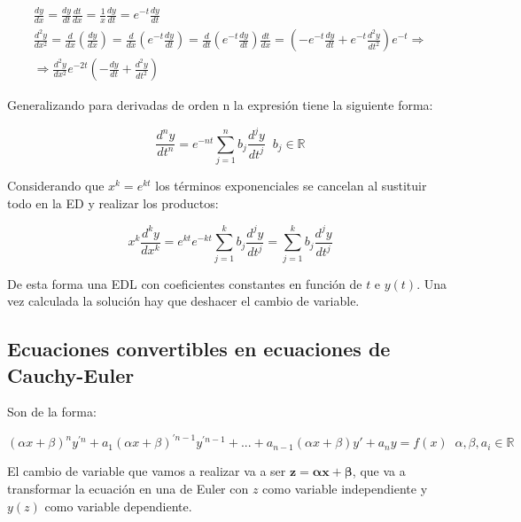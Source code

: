 \documentclass[a4paper,12pt,titlepage]{article}
\begin{document}
\begin{equation}
    \begin{gathered}
        \frac{dy}{dx} = \frac{dy}{dt} \frac{dt}{dx} = \frac{1}{x} \frac{dy}{dt} = e^{-t} \frac{dy}{dt} \\
        \frac{d^2 y}{d x^2}=\frac{d}{d x}\left(\frac{d y}{d x}\right)=\frac{d}{d x}\left(e^{-t} \frac{d y}{d t}\right)=\frac{d}{d t}\left(e^{-t} \frac{d y}{d t}\right) \frac{d t}{d x}=\left(-e^{-t} \frac{d y}{d t}+e^{-t} \frac{d^2 y}{d t^2}\right) e^{-t} \Rightarrow \\ \Rightarrow \frac{d^2y}{dx^2}e^{-2 t}\left(-\frac{d y}{d t}+\frac{d^2 y}{d t^2}\right)
    \end{gathered}
\end{equation}

Generalizando para derivadas de orden n la expresión tiene la siguiente forma:

\begin{equation}
    \frac{d^ny}{dt^n} = e^{-nt} \sum_{j=1}^{n} b_j \frac{d^jy}{dt^j} \; \; b_j \in \mathbb{R}
\end{equation}

Considerando que $x^k = e^{kt}$ los términos exponenciales se cancelan al sustituir todo en la ED y realizar los productos:

\begin{equation}
    x^k \frac{d^k y}{dx^k} = e^{kt} e^{-kt} \sum_{j=1}^{k} b_j \frac{d^j y}{dt^j} = \sum_{j=1}^{k} b_j \frac{d^j y}{dt^j}
\end{equation}

De esta forma una EDL con coeficientes constantes en función de $t$ e $y(t)$. Una vez calculada la solución hay que deshacer el cambio de variable.

\subsection{Ecuaciones convertibles en ecuaciones de Cauchy-Euler}

Son de la forma:

\begin{equation}
    (\alpha x + \beta)^n y^{'n} + a_1(\alpha x + \beta)^{'n-1}y^{'n-1} + ... + a_{n-1}(\alpha x + \beta)y' + a_ny = f(x) \;\; \alpha , \beta, a_i \in \mathbb R
\end{equation}

El cambio de variable que vamos a realizar va a ser $\mathbf{z = \alpha x + \beta}$, que va a transformar la ecuación en una de Euler con $z$ como variable independiente y $y(z)$ como variable dependiente.
\end{document}
